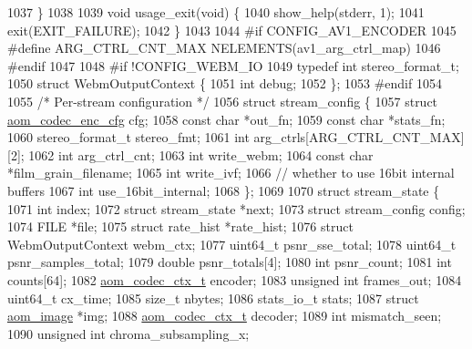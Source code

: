 \begin{DoxyCodeInclude}
{{{{{{{{{1037 \}
1038 
1039 \textcolor{keywordtype}{void} usage\_exit(\textcolor{keywordtype}{void}) \{
1040   show\_help(stderr, 1);
1041   exit(EXIT\_FAILURE);
1042 \}
1043 
1044 \textcolor{preprocessor}{#if CONFIG\_AV1\_ENCODER}
1045 \textcolor{preprocessor}{#define ARG\_CTRL\_CNT\_MAX NELEMENTS(av1\_arg\_ctrl\_map)}
1046 \textcolor{preprocessor}{#endif}
1047 
1048 \textcolor{preprocessor}{#if !CONFIG\_WEBM\_IO}
1049 \textcolor{keyword}{typedef} \textcolor{keywordtype}{int} stereo\_format\_t;
1050 \textcolor{keyword}{struct }WebmOutputContext \{
1051   \textcolor{keywordtype}{int} debug;
1052 \};
1053 \textcolor{preprocessor}{#endif}
1054 
1055 \textcolor{comment}{/* Per-stream configuration */}
1056 \textcolor{keyword}{struct }stream\_config \{
1057   \textcolor{keyword}{struct }\hyperlink{structaom__codec__enc__cfg}{aom\_codec\_enc\_cfg} cfg;
1058   \textcolor{keyword}{const} \textcolor{keywordtype}{char} *out\_fn;
1059   \textcolor{keyword}{const} \textcolor{keywordtype}{char} *stats\_fn;
1060   stereo\_format\_t stereo\_fmt;
1061   \textcolor{keywordtype}{int} arg\_ctrls[ARG\_CTRL\_CNT\_MAX][2];
1062   \textcolor{keywordtype}{int} arg\_ctrl\_cnt;
1063   \textcolor{keywordtype}{int} write\_webm;
1064   \textcolor{keyword}{const} \textcolor{keywordtype}{char} *film\_grain\_filename;
1065   \textcolor{keywordtype}{int} write\_ivf;
1066   \textcolor{comment}{// whether to use 16bit internal buffers}
1067   \textcolor{keywordtype}{int} use\_16bit\_internal;
1068 \};
1069 
1070 \textcolor{keyword}{struct }stream\_state \{
1071   \textcolor{keywordtype}{int} index;
1072   \textcolor{keyword}{struct }stream\_state *next;
1073   \textcolor{keyword}{struct }stream\_config config;
1074   FILE *file;
1075   \textcolor{keyword}{struct }rate\_hist *rate\_hist;
1076   \textcolor{keyword}{struct }WebmOutputContext webm\_ctx;
1077   uint64\_t psnr\_sse\_total;
1078   uint64\_t psnr\_samples\_total;
1079   \textcolor{keywordtype}{double} psnr\_totals[4];
1080   \textcolor{keywordtype}{int} psnr\_count;
1081   \textcolor{keywordtype}{int} counts[64];
1082   \hyperlink{structaom__codec__ctx}{aom\_codec\_ctx\_t} encoder;
1083   \textcolor{keywordtype}{unsigned} \textcolor{keywordtype}{int} frames\_out;
1084   uint64\_t cx\_time;
1085   \textcolor{keywordtype}{size\_t} nbytes;
1086   stats\_io\_t stats;
1087   \textcolor{keyword}{struct }\hyperlink{structaom__image}{aom\_image} *img;
1088   \hyperlink{structaom__codec__ctx}{aom\_codec\_ctx\_t} decoder;
1089   \textcolor{keywordtype}{int} mismatch\_seen;
1090   \textcolor{keywordtype}{unsigned} \textcolor{keywordtype}{int} chroma\_subsampling\_x;
}}}}}}}}}
\end{DoxyCodeInclude}
